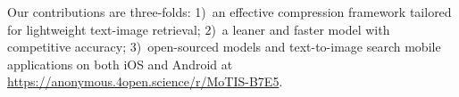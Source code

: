 Our contributions are three-folds: 1)~an effective compression framework tailored for lightweight text-image retrieval; 2)~a leaner and faster model with competitive accuracy; 3)~open-sourced models and text-to-image search mobile applications on both iOS and Android at \url{https://anonymous.4open.science/r/MoTIS-B7E5}.
